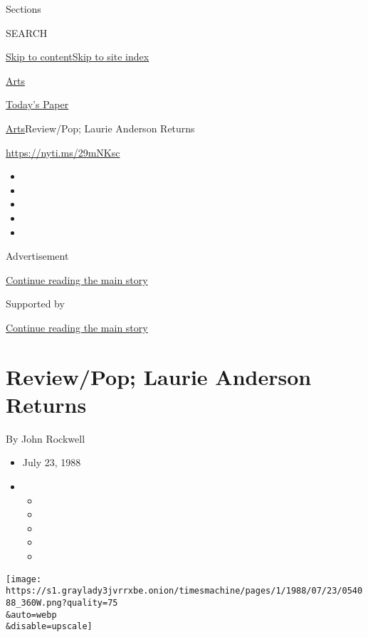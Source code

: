 Sections

SEARCH

\protect\hyperlink{site-content}{Skip to
content}\protect\hyperlink{site-index}{Skip to site index}

\href{https://www.nytimes3xbfgragh.onion/section/arts}{Arts}

\href{https://myaccount.nytimes3xbfgragh.onion/auth/login?response_type=cookie\&client_id=vi}{}

\href{https://www.nytimes3xbfgragh.onion/section/todayspaper}{Today's
Paper}

\href{/section/arts}{Arts}\textbar{}Review/Pop; Laurie Anderson Returns

\url{https://nyti.ms/29mNKsc}

\begin{itemize}
\item
\item
\item
\item
\item
\end{itemize}

Advertisement

\protect\hyperlink{after-top}{Continue reading the main story}

Supported by

\protect\hyperlink{after-sponsor}{Continue reading the main story}

\hypertarget{reviewpop-laurie-anderson-returns}{%
\section{Review/Pop; Laurie Anderson
Returns}\label{reviewpop-laurie-anderson-returns}}

By John Rockwell

\begin{itemize}
\item
  July 23, 1988
\item
  \begin{itemize}
  \item
  \item
  \item
  \item
  \item
  \end{itemize}
\end{itemize}

\texttt{[image: https://s1.graylady3jvrrxbe.onion/timesmachine/pages/1/1988/07/23/054088\_360W.png?quality=75\\\&auto=webp\\\&disable=upscale]}

